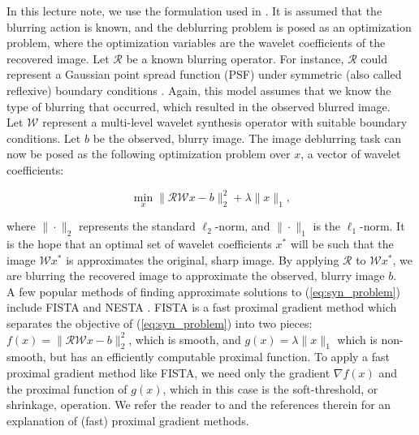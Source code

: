 \documentclass[journal]{IEEEtran}
\begin{document}
In this lecture note, we use the formulation used in \cite{beck_2009}.  It is assumed that the blurring action is known, and the deblurring problem is posed as an optimization problem, where the optimization variables are the wavelet coefficients of the recovered image.  Let $\mathcal{R}$ be a known blurring operator.  For instance, $\mathcal{R}$ could represent a Gaussian point spread function (PSF) under symmetric (also called reflexive) boundary conditions \cite{hansen_2006}.  Again, this model assumes that we know the type of blurring that occurred, which resulted in the observed blurred image.\\

Let $\mathcal{W}$ represent a multi-level wavelet synthesis operator with suitable boundary conditions.  Let $b$ be the observed, blurry image.  The image deblurring task can now be posed as the following optimization problem over $x$, a vector of wavelet coefficients:

\begin{equation}
\label{eq:syn_problem}
\min_x \|\mathcal{RW}x-b\|_2^2 + \lambda \|x\|_1,
\end{equation}

\noindent where $\|\cdot\|_2$ represents the standard $\ell_2$-norm, and $\|\cdot\|_1$ is the $\ell_1$-norm.  It is the hope that an optimal set of wavelet coefficients $x^\ast$ will be such that the image $\mathcal{W}x^\ast$ is approximates the original, sharp image.  By applying $\mathcal{R}$ to $\mathcal{W}x^\ast$, we are blurring the recovered image to approximate the observed, blurry image $b$.\\


A few popular methods of finding approximate solutions to (\ref{eq:syn_problem}) include FISTA \cite{beck_2009} and NESTA \cite{becker_2011}.  FISTA is a fast proximal gradient method which separates the objective of (\ref{eq:syn_problem}) into two pieces: $f(x)=\|\mathcal{RW}x-b\|_2^2$, which is smooth, and $g(x) = \lambda\|x\|_1$ which is non-smooth, but has an efficiently computable proximal function.  To apply a fast proximal gradient method like FISTA, we need only the gradient $\nabla f(x)$ and the proximal function of $g(x)$, which in this case is the soft-threshold, or shrinkage, operation.  We refer the reader to \cite{beck_2009} and the references therein for an explanation of (fast) proximal gradient methods.\\
\end{document}
